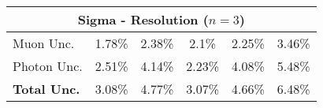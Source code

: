 \begin{tabular}{|l|c|c|c|c|c|}
\multicolumn{6}{|c|}{\textbf{Sigma - Resolution ($n=3$)}}            \\ \hline 
Muon Unc.           & 1.78\% & 2.38\% & 2.1\% & 2.25\% & 3.46\% \\ \hline
Photon Unc.         & 2.51\% & 4.14\% & 2.23\% & 4.08\% & 5.48\% \\ \hline
\textbf{Total Unc.} & 3.08\% & 4.77\% & 3.07\% & 4.66\% & 6.48\% \\ \hline  
\end{tabular}
